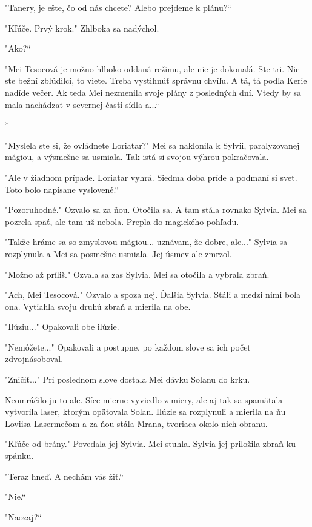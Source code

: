 \documentclass{book}
\begin{document}
"$ $Tanery, je ešte, čo od nás chcete? Alebo prejdeme k plánu?“

"$ $Kľúče. Prvý krok."$ $ Zhlboka sa nadýchol.

"$ $Ako?“

"$ $Mei Tesocová je možno hlboko oddaná režimu, ale nie je dokonalá.  Ste tri. Nie ste bežní zblúdilci, to viete. Treba vystihnúť správnu chvíľu. A tá, tá podľa Kerie nadíde večer. Ak teda Mei nezmenila svoje plány z posledných dní. Vtedy by sa mala nachádzať v severnej časti sídla a...“

\begin{center}
*
\end{center}

"$ $Myslela ste si, že ovládnete Loriatar?"$ $ Mei sa naklonila k Sylvii, paralyzovanej mágiou, a výsmešne sa usmiala. Tak istá si svojou výhrou pokračovala.

"$ $Ale v žiadnom prípade. Loriatar vyhrá. Siedma doba príde a podmaní si svet. Toto bolo napísane vyslovené.“

"$ $Pozoruhodné."$ $ Ozvalo sa za ňou. Otočila sa. A tam stála rovnako Sylvia. Mei sa pozrela späť, ale tam už nebola. Prepla do magického pohľadu.

"$ $Takže hráme sa so zmyslovou mágiou... uznávam, že dobre, ale..."$ $ Sylvia sa rozplynula a Mei sa posmešne usmiala. Jej úsmev ale zmrzol.

"$ $Možno až príliš."$ $ Ozvala sa zas Sylvia. Mei sa otočila a vybrala zbraň.

"$ $Ach, Mei Tesocová."$ $ Ozvalo a spoza nej. Ďalšia Sylvia. Stáli a medzi nimi  bola ona. Vytiahla svoju druhú zbraň a mierila na obe.

"$ $Ilúziu..."$ $ Opakovali obe ilúzie.

"$ $Nemôžete..."$ $ Opakovali a postupne, po každom slove sa ich počet zdvojnásoboval.

"$ $Zničiť..."$ $ Pri poslednom slove dostala Mei dávku Solanu do krku.

Neomráčilo ju to ale. Síce mierne vyviedlo z miery, ale aj tak sa spamätala vytvorila laser, ktorým opätovala Solan. Ilúzie sa rozplynuli a mierila na ňu Loviisa Lasermečom a za ňou stála Mrana, tvoriaca okolo nich obranu.

"$ $Kľúče od brány."$ $ Povedala jej Sylvia. Mei stuhla. Sylvia jej priložila zbraň ku spánku.

"$ $Teraz hneď. A nechám vás žiť.“

"$ $Nie.“

"$ $Naozaj?“
\end{document}
